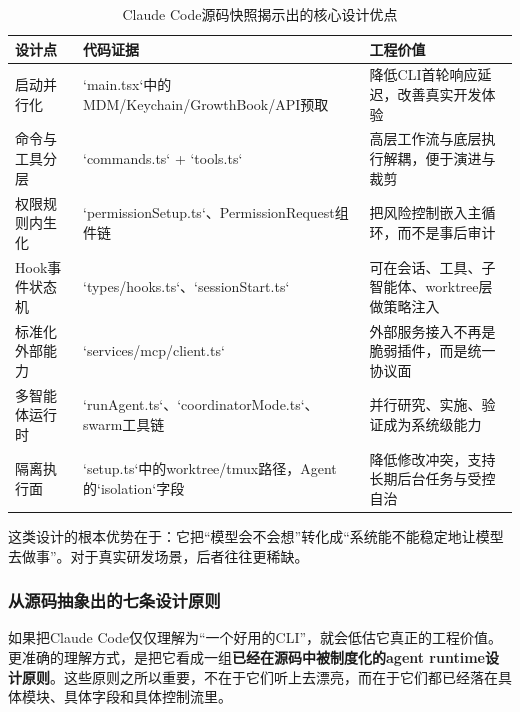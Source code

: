 \documentclass[12pt,a4paper]{article}
\begin{document}
\begin{table}[H]
\centering
\caption{Claude Code源码快照揭示出的核心设计优点}
\begin{tabular}{p{3.0cm}p{4.6cm}p{4.8cm}}
\toprule
\textbf{设计点} & \textbf{代码证据} & \textbf{工程价值} \\
\midrule
启动并行化 & `main.tsx`中的MDM/Keychain/GrowthBook/API预取 & 降低CLI首轮响应延迟，改善真实开发体验 \\
命令与工具分层 & `commands.ts` + `tools.ts` & 高层工作流与底层执行解耦，便于演进与裁剪 \\
权限规则内生化 & `permissionSetup.ts`、PermissionRequest组件链 & 把风险控制嵌入主循环，而不是事后审计 \\
Hook事件状态机 & `types/hooks.ts`、`sessionStart.ts` & 可在会话、工具、子智能体、worktree层做策略注入 \\
标准化外部能力 & `services/mcp/client.ts` & 外部服务接入不再是脆弱插件，而是统一协议面 \\
多智能体运行时 & `runAgent.ts`、`coordinatorMode.ts`、swarm工具链 & 并行研究、实施、验证成为系统级能力 \\
隔离执行面 & `setup.ts`中的worktree/tmux路径，Agent的`isolation`字段 & 降低修改冲突，支持长期后台任务与受控自治 \\
\bottomrule
\end{tabular}
\end{table}

这类设计的根本优势在于：它把“模型会不会想”转化成“系统能不能稳定地让模型去做事”。对于真实研发场景，后者往往更稀缺。

\subsubsection{从源码抽象出的七条设计原则}

如果把Claude Code仅仅理解为“一个好用的CLI”，就会低估它真正的工程价值。更准确的理解方式，是把它看成一组\textbf{已经在源码中被制度化的agent runtime设计原则}。这些原则之所以重要，不在于它们听上去漂亮，而在于它们都已经落在具体模块、具体字段和具体控制流里。
\end{document}
